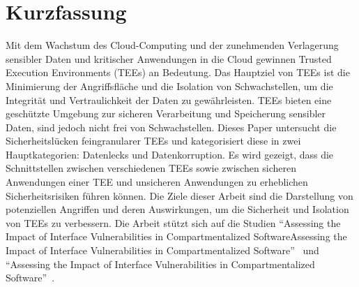 \section*{Kurzfassung}
Mit dem Wachstum des Cloud-Computing und der zunehmenden Verlagerung sensibler Daten und kritischer Anwendungen in die Cloud gewinnen Trusted Execution Environments (TEEs) an Bedeutung. Das Hauptziel von TEEs ist die Minimierung der Angriffsfläche und die Isolation von Schwachstellen, um die Integrität und Vertraulichkeit der Daten zu gewährleisten. TEEs bieten eine geschützte Umgebung zur sicheren Verarbeitung und Speicherung sensibler Daten, sind jedoch nicht frei von Schwachstellen. 
Dieses Paper untersucht die Sicherheitslücken feingranularer TEEs und kategorisiert diese in zwei Hauptkategorien: Datenlecks und Datenkorruption. Es wird gezeigt, dass die Schnittstellen zwischen verschiedenen TEEs sowie zwischen sicheren Anwendungen einer TEE und unsicheren Anwendungen zu erheblichen Sicherheitsrisiken führen können.
Die Ziele dieser Arbeit sind die Darstellung von potenziellen Angriffen und deren Auswirkungen, um die Sicherheit und Isolation von TEEs zu verbessern. Die Arbeit stützt sich auf die Studien \enquote{Assessing the Impact of Interface Vulnerabilities in Compartmentalized SoftwareAssessing the Impact of Interface Vulnerabilities in Compartmentalized Software}~\cite{CIVPaper} und \enquote{Assessing the Impact of Interface Vulnerabilities in Compartmentalized Software}~\cite{TEEPaper}.